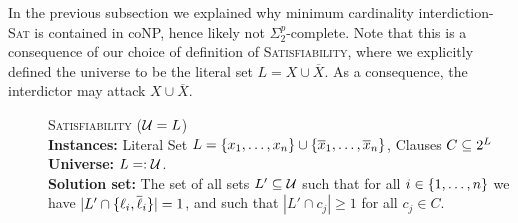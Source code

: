 In the previous subsection we explained why minimum cardinality interdiction-\textsc{Sat} is contained in coNP, hence likely not $\Sigma^p_2$-complete.
Note that this is a consequence of our choice of definition of \textsc{Satisfiability}, where we explicitly defined the universe to be the literal set $L = X \cup \overline X$.
As a consequence, the interdictor may attack $X \cup \overline X$. 
\begin{samepage}
    \begin{mdframed}
    	\begin{description}
        \item[]\textsc{Satisfiability ($\mathcal{U} = L$)}\hfill\\
        \textbf{Instances:} Literal Set $L = \{ x_1, \ldots, x_n \} \cup \{ \overline x_1, \ldots, \overline x_n \}$, Clauses $C \subseteq 2^{L}$\\
        \textbf{Universe:} $L =: \mathcal{U}$.\\
        \textbf{Solution set:} The set of all sets $L' \subseteq \mathcal{U}$ such that for all $i \in \{ 1, \ldots, n \}$ we have $|L' \cap \{ \ell_i, \overline \ell_i \}| = 1$, and such that $|L' \cap c_j| \geq 1$ for all $c_j \in C$.
    	\end{description}
    \end{mdframed}
\end{samepage}

